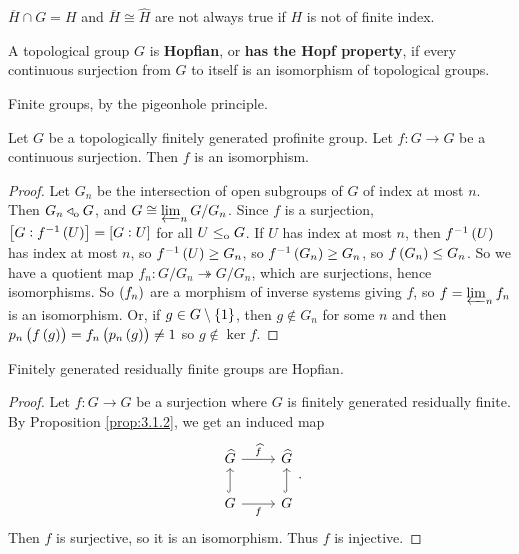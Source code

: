 \begin{remark}
$ \overline{H} \cap G = H $ and $ \overline{H} \cong \widehat{H} $ are not always true if $ H $ is not of finite index.
\end{remark}

\begin{definition}
A topological group $ G $ is \textbf{Hopfian}, or \textbf{has the Hopf property}, if every continuous surjection from $ G $ to itself is an isomorphism of topological groups.
\end{definition}

\begin{example}
Finite groups, by the pigeonhole principle.
\end{example}

\begin{proposition}
Let $ G $ be a topologically finitely generated profinite group. Let $ f : G \to G $ be a continuous surjection. Then $ f $ is an isomorphism.
\end{proposition}

\begin{proof}
Let $ G_n $ be the intersection of open subgroups of $ G $ of index at most $ n $. Then $ G_n \triangleleft_{\mathrm{o}} G $, and $ G \cong \varprojlim_n G / G_n $. Since $ f $ is a surjection, $ \sbr{G : f^{-1}\br{U}} = \sbr{G : U} $ for all $ U \le_{\mathrm{o}} G $. If $ U $ has index at most $ n $, then $ f^{-1}\br{U} $ has index at most $ n $, so $ f^{-1}\br{U} \ge G_n $, so $ f^{-1}\br{G_n} \ge G_n $, so $ f\br{G_n} \le G_n $. So we have a quotient map $ f_n : G / G_n \twoheadrightarrow G / G_n $, which are surjections, hence isomorphisms. So $ \br{f_n} $ are a morphism of inverse systems giving $ f $, so $ f = \varprojlim_n f_n $ is an isomorphism. Or, if $ g \in G \setminus \cbr{1} $, then $ g \notin G_n $ for some $ n $ and then $ p_n\br{f\br{g}} = f_n\br{p_n\br{g}} \ne 1 $ so $ g \notin \ker f $.
\end{proof}

\begin{corollary}
Finitely generated residually finite groups are Hopfian.
\end{corollary}

\begin{proof}
Let $ f : G \to G $ be a surjection where $ G $ is finitely generated residually finite. By Proposition \ref{prop:3.1.2}, we get an induced map
$$
\begin{tikzcd}
\widehat{G} \arrow{r}{\widehat{f}} & \widehat{G} \\
G \arrow[hookrightarrow]{u} \arrow{r}[swap]{f} & G \arrow[hookrightarrow]{u}
\end{tikzcd}.
$$
Then $ \widehat{f} $ is surjective, so it is an isomorphism. Thus $ f $ is injective.
\end{proof}

